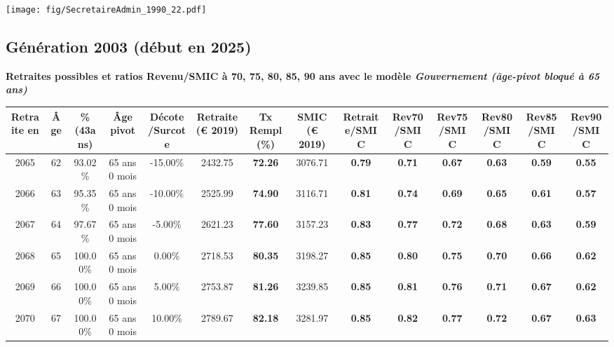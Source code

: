  \vspace{0.1cm} 

 \begin{center}\texttt{[image: fig/SecretaireAdmin\_1990\_22.pdf]}\end{center} \label{fig/SecretaireAdmin_1990_22.pdf} 

\newpage 
 
\subsection{Génération 2003 (début en 2025)} 

{\bf \noindent Retraites possibles et ratios Revenu/SMIC à 70, 75, 80, 85, 90 ans avec le modèle \emph{Gouvernement (âge-pivot bloqué à 65 ans)}}  
 
\begin{adjustbox}{max width=\textwidth} 
\begin{tabular}[htb]{|c|c||c|c|c||c|c||c||c|c|c|c|c|c|} 
\hline 
 Retraite en &  Âge &  \%(43ans) &  Âge pivot &  Décote/Surcote &  Retraite (\euro{} 2019) &  Tx Rempl(\%) &  SMIC (\euro{} 2019) &  Retraite/SMIC &  Rev70/SMIC &  Rev75/SMIC &  Rev80/SMIC &  Rev85/SMIC &  Rev90/SMIC \\ 
\hline \hline 
 2065 &  62 &  93.02\% &  65 ans 0 mois &  -15.00\% &  2432.75 &  {\bf 72.26} &  3076.71 &  {\bf {\color{red} 0.79}} &  {\bf {\color{red} 0.71}} &  {\bf {\color{red} 0.67}} &  {\bf {\color{red} 0.63}} &  {\bf {\color{red} 0.59}} &  {\bf {\color{red} 0.55}} \\ 
\hline 
 2066 &  63 &  95.35\% &  65 ans 0 mois &  -10.00\% &  2525.99 &  {\bf 74.90} &  3116.71 &  {\bf {\color{red} 0.81}} &  {\bf {\color{red} 0.74}} &  {\bf {\color{red} 0.69}} &  {\bf {\color{red} 0.65}} &  {\bf {\color{red} 0.61}} &  {\bf {\color{red} 0.57}} \\ 
\hline 
 2067 &  64 &  97.67\% &  65 ans 0 mois &  -5.00\% &  2621.23 &  {\bf 77.60} &  3157.23 &  {\bf {\color{red} 0.83}} &  {\bf {\color{red} 0.77}} &  {\bf {\color{red} 0.72}} &  {\bf {\color{red} 0.68}} &  {\bf {\color{red} 0.63}} &  {\bf {\color{red} 0.59}} \\ 
\hline 
 2068 &  65 &  100.00\% &  65 ans 0 mois &  0.00\% &  2718.53 &  {\bf 80.35} &  3198.27 &  {\bf {\color{red} 0.85}} &  {\bf {\color{red} 0.80}} &  {\bf {\color{red} 0.75}} &  {\bf {\color{red} 0.70}} &  {\bf {\color{red} 0.66}} &  {\bf {\color{red} 0.62}} \\ 
\hline 
 2069 &  66 &  100.00\% &  65 ans 0 mois &  5.00\% &  2753.87 &  {\bf 81.26} &  3239.85 &  {\bf {\color{red} 0.85}} &  {\bf {\color{red} 0.81}} &  {\bf {\color{red} 0.76}} &  {\bf {\color{red} 0.71}} &  {\bf {\color{red} 0.67}} &  {\bf {\color{red} 0.62}} \\ 
\hline 
 2070 &  67 &  100.00\% &  65 ans 0 mois &  10.00\% &  2789.67 &  {\bf 82.18} &  3281.97 &  {\bf {\color{red} 0.85}} &  {\bf {\color{red} 0.82}} &  {\bf {\color{red} 0.77}} &  {\bf {\color{red} 0.72}} &  {\bf {\color{red} 0.67}} &  {\bf {\color{red} 0.63}} \\ 
\hline 
\hline 
\end{tabular} 
\end{adjustbox} 
 
